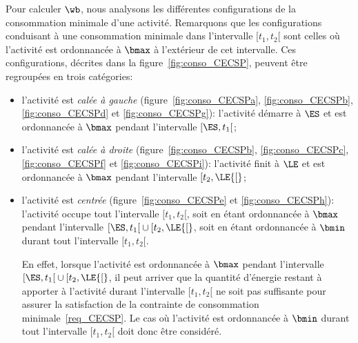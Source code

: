 Pour calculer $\wb$, nous analysons les différentes configurations de
la consommation minimale d'une activité. Remarquons que les
configurations conduisant à une consommation minimale dans
l'intervalle $[t_1,t_2{[}$ sont celles où l'activité est ordonnancée à
$\bmax$ à l'extérieur de cet intervalle. Ces configurations, décrites
dans la figure~\ref{fig:conso_CECSP}, peuvent être regroupées en trois
catégories:
\begin{itemize}
\item l'activité est {\it calée à
    gauche} (figure~\ref{fig:conso_CECSPa}, \ref{fig:conso_CECSPb},
  \ref{fig:conso_CECSPd} et \ref{fig:conso_CECSPg}): l'activité démarre
  à $\ES$ et est ordonnancée à $\bmax$ pendant l'intervalle
  $[\ES,t_1{[}$;
\item l'activité est {\it calée à
    droite} (figure~\ref{fig:conso_CECSPb}, \ref{fig:conso_CECSPc},
  \ref{fig:conso_CECSPf} et \ref{fig:conso_CECSPi}): l'activité finit à
  $\LE$ et est ordonnancée à $\bmax$ pendant l'intervalle $[t_2,\LE{[}$;
\item l'activité est {\it centrée} (figure~\ref{fig:conso_CECSPe} et
  \ref{fig:conso_CECSPh}): l'activité occupe tout l'intervalle
  $[t_1,t_2[$, soit en étant ordonnancée à $\bmax$ pendant l'intervalle
  $[\ES,t_1{[} \cup [t_2,\LE{[}$, soit en étant ordonnancée à $\bmin$
  durant tout l'intervalle $[t_1,t_2{[}$.

  En effet, lorsque l'activité est ordonnancée à $\bmax$ pendant
  l'intervalle $[\ES,t_1{[} \cup [t_2,\LE{[}$, il peut arriver que la
  quantité d'énergie restant à apporter à l'activité durant l'intervalle
  $[t_1,t_2[$ ne soit pas suffisante pour assurer la satisfaction de la
  contrainte de consommation minimale~\eqref{req_CECSP}. Le cas où
  l'activité est ordonnancée à $\bmin$ durant tout l'intervalle
  $[t_1,t_2{[}$ doit donc être considéré.
\end{itemize}

